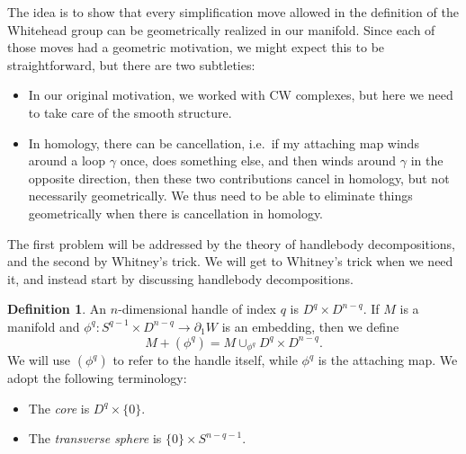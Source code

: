 \documentclass[a4paper, 12pt]{article}
\theoremstyle{definition}
\newtheorem{defi}[thm]{Definition}
\begin{document}
The idea is to show that every simplification move allowed in the definition of the Whitehead group can be geometrically realized in our manifold. Since each of those moves had a geometric motivation, we might expect this to be straightforward, but there are two subtleties:
\begin{itemize}
  \item In our original motivation, we worked with CW complexes, but here we need to take care of the smooth structure.
  \item In homology, there can be cancellation, i.e.\ if my attaching map winds around a loop $\gamma$ once, does something else, and then winds around $\gamma$ in the opposite direction, then these two contributions cancel in homology, but not necessarily geometrically. We thus need to be able to eliminate things geometrically when there is cancellation in homology.
\end{itemize}
The first problem will be addressed by the theory of handlebody decompositions, and the second by Whitney's trick. We will get to Whitney's trick when we need it, and instead start by discussing handlebody decompositions.

\begin{defi}
  An $n$-dimensional handle of index $q$ is $D^q \times D^{n - q}$. If $M$ is a manifold and $\phi^q: S^{q - 1} \times D^{n - q} \to \partial_1 W$ is an embedding, then we define
  \[
    M + (\phi^q) = M \cup_{\phi^q} D^q \times D^{n - q}.
  \]
  We will use $(\phi^q)$ to refer to the handle itself, while $\phi^q$ is the attaching map. We adopt the following terminology:
  \begin{itemize}
    \item The \emph{core} is $D^q \times \{0\}$.
    \item The \emph{transverse sphere} is $\{0\} \times S^{n - q - 1}$.
  \end{itemize}
\end{defi}
\end{document}
